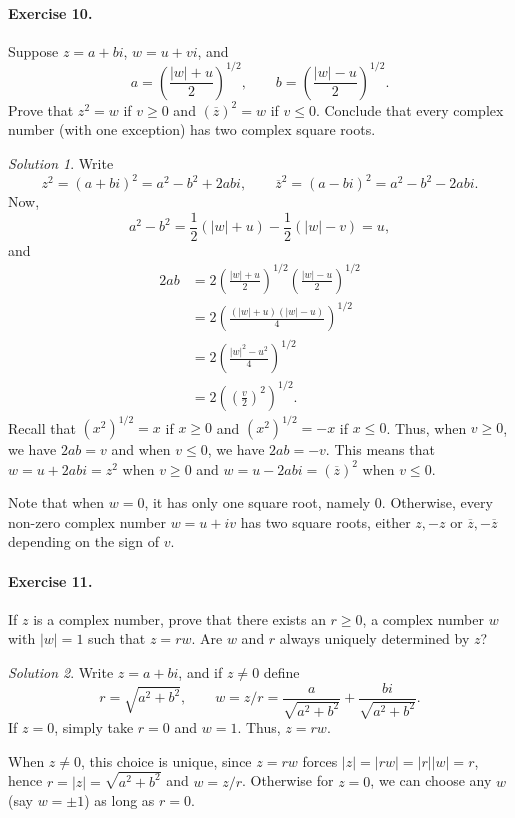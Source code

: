 \documentclass[11pt]{report}
\theoremstyle{remark}
\newtheorem*{solution}{Solution}
\begin{document}
    \paragraph{Exercise 10.} Suppose $z = a + bi$, $w = u + vi$, and \[
        a = \left(\frac{|w| + u}{2}\right)^{1 / 2}, \qquad
        b = \left(\frac{|w| - u}{2}\right)^{1 / 2}.
    \] Prove that $z^2 = w$ if $v \geq 0$ and $(\overline{z})^2 = w$ if $v \leq 0$.
    Conclude that every complex number (with one exception) has two complex square
    roots.
    \begin{solution}
        Write \[
            z^2 = (a + bi)^2 = a^2 - b^2 + 2abi, \qquad
            \overline{z}^2 = (a - bi)^2 = a^2 - b^2 - 2abi.
        \] Now, \[
            a^2 - b^2 = \frac{1}{2}(|w| + u) - \frac{1}{2}(|w| - v) = u,
        \] and 
        \begin{align*}
            2ab &= 2\left(\frac{|w| + u}{2}\right)^{1 / 2}\left(\frac{|w| -
                    u}{2}\right)^{1 / 2} \\
                &= 2\left(\frac{(|w| + u)(|w| - u)}{4}\right)^{1 / 2} \\
                &= 2\left(\frac{|w|^2 - u^2}{4}\right)^{1 / 2} \\
                &= 2\left(\left(\frac{v}{2}\right)^2\right)^{1 / 2}.
        \end{align*}
        Recall that $(x^2)^{1 / 2} = x$ if $x \geq 0$ and $(x^2)^{1 / 2} = -x$ if $x
        \leq 0$. Thus, when $v \geq 0$, we have $2ab = v$ and when $v \leq 0$, we
        have $2ab = -v$. This means that $w = u + 2abi = z^2$ when $v \geq 0$ and $w =
        u - 2abi = (\overline{z})^2$ when $v \leq 0$.

        Note that when $w = 0$, it has only one square root, namely $0$. Otherwise,
        every non-zero complex number $w = u + iv$ has two square roots, either $z,
        -z$ or $\overline{z}, -\overline{z}$ depending on the sign of $v$.
    \end{solution}

    \paragraph{Exercise 11.} If $z$ is a complex number, prove that there exists an
    $r \geq 0$, a complex number $w$ with $|w| = 1$ such that $z = rw$. Are $w$ and
    $r$ always uniquely determined by $z$?
    \begin{solution}
        Write $z = a + bi$, and if $z \neq 0$ define \[
            r = \sqrt{a^2 + b^2}, \qquad
            w = z / r = \frac{a}{\sqrt{a^2 + b^2}} + \frac{bi}{\sqrt{a^2 + b^2}}.
        \] If $z = 0$, simply take $r = 0$ and $w = 1$. Thus, $z = rw$.

        When $z \neq 0$, this choice is unique, since $z = rw$ forces $|z| = |rw| =
        |r| |w| = r$, hence $r = |z| = \sqrt{a^2 + b^2}$ and $w = z / r$. Otherwise
        for $z = 0$, we can choose any $w$ (say $w = \pm 1$) as long as $r = 0$.
    \end{solution}
\end{document}
